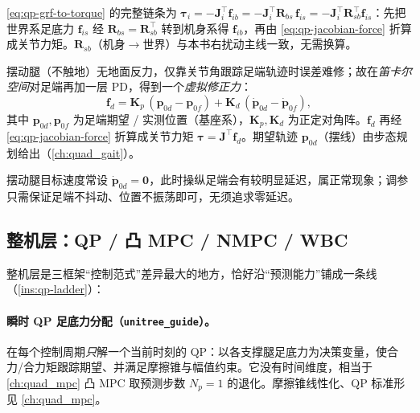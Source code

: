 \begin{note}[足底力转力矩的逐步换算]
\cref{eq:qp-grf-to-torque} 的完整链条为 $\boldsymbol{\tau}_i=-\mathbf{J}_i^\top\boldsymbol{f}_{ib}=-\mathbf{J}_i^\top\mathbf{R}_{bs}\,\boldsymbol{f}_{is}=-\mathbf{J}_i^\top\mathbf{R}_{sb}^\top\boldsymbol{f}_{is}$：先把世界系足底力 $\boldsymbol{f}_{is}$ 经 $\mathbf{R}_{bs}=\mathbf{R}_{sb}^\top$ 转到机身系得 $\boldsymbol{f}_{ib}$，再由 \cref{eq:qp-jacobian-force} 折算成关节力矩。$\mathbf{R}_{sb}$（机身$\to$世界）与本书右扰动主线一致，无需换算。
\end{note}

摆动腿（不触地）无地面反力，仅靠关节角跟踪足端轨迹时误差难修；故在\emph{笛卡尔空间}对足端再加一层 PD，得到一个\emph{虚拟修正力}\cite{unitree2023quadruped}：
\begin{equation}
  \boldsymbol{f}_d=\mathbf{K}_p\,(\boldsymbol{p}_{0d}-\boldsymbol{p}_{0f})+\mathbf{K}_d\,(\dot{\boldsymbol{p}}_{0d}-\dot{\boldsymbol{p}}_{0f}),
  \label{eq:qp-swing-force}
\end{equation}
其中 $\boldsymbol{p}_{0d},\boldsymbol{p}_{0f}$ 为足端期望 / 实测位置（基座系），$\mathbf{K}_p,\mathbf{K}_d$ 为正定对角阵。$\boldsymbol{f}_d$ 再经 \cref{eq:qp-jacobian-force} 折算成关节力矩 $\boldsymbol{\tau}=\mathbf{J}^\top\boldsymbol{f}_d$。期望轨迹 $\boldsymbol{p}_{0d}$（摆线）由步态规划给出（\cref{ch:quad_gait}）。

\begin{practice}[摆动腿调参]
摆动腿目标速度常设 $\dot{\boldsymbol{p}}_{0d}=\mathbf{0}$，此时操纵足端会有较明显延迟，属正常现象；调参只需保证足端不抖动、位置不振荡即可，无须追求零延迟\cite{unitree2023quadruped}。
\end{practice}

\subsection{整机层：QP / 凸 MPC / NMPC / WBC}
\label{subsec:qp-whole}

整机层是三框架“控制范式”差异最大的地方，恰好沿“预测能力”铺成一条线（\cref{ins:qp-ladder}）：

\paragraph{瞬时 QP 足底力分配（\texttt{unitree\_guide}）。}
在每个控制周期\emph{只}解一个当前时刻的 QP：以各支撑腿足底力为决策变量，使合力/合力矩跟踪期望、并满足摩擦锥与幅值约束。它没有时间维度，相当于 \cref{ch:quad_mpc} 凸 MPC 取预测步数 $N_p{=}1$ 的退化。摩擦锥线性化、QP 标准形见 \cref{ch:quad_mpc}。

